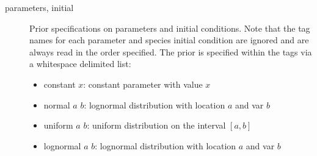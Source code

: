 \documentclass[a4paper]{report}
\begin{document}
\begin{description}
\begin{description}
		\item[parameters, initial] Prior specifications on parameters and initial conditions. Note that the tag names for each parameter and species initial condition are ignored and are always read in the order specified. The prior is specified within the tags via a whitespace delimited list:
		\begin{itemize}
			\item constant $x$: constant parameter with value $x$
			\item normal  $a$ $b$: lognormal distribution with location $a$ and var $b$ 
			\item uniform  $a$  $b$: uniform distribution on the interval $[a, b]$
			\item lognormal  $a$ $b$: lognormal distribution with location $a$ and var $b$ 
		\end{itemize}
	\end{description}
\end{description}
\end{document}
